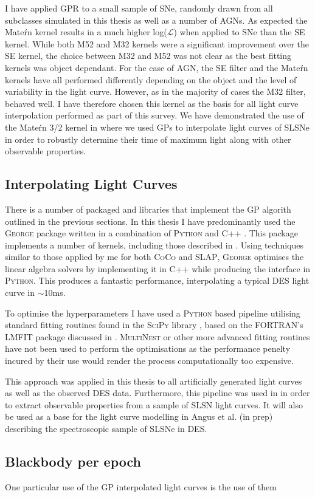 I have applied GPR to a small sample of SNe, randomly drawn from all subclasses simulated in this thesis as well as a number of AGNs. As expected the Mate\'rn kernel results in a much higher log($\mathcal{L}$) when applied to SNe than the SE kernel. While both M52 and M32 kernels were a significant improvement over the SE kernel, the choice between M32 and M52 was not clear as the best fitting kernels was object dependant. For the case of AGN, the SE filter and the Mate\'rn kernels have all performed differently depending on the object and the level of variability in the light curve. However, as in the majority of cases the M32 filter, behaved  well. I have therefore chosen this kernel as the basis for all light curve interpolation performed as part of this survey. We have demonstrated the use of the Mate\'rn 3/2 kernel in \citet{Inserra2018} where we used GPs to interpolate light curves of SLSNe in order to robustly determine their time of maximum light along with other observable properties.

\subsection{Interpolating Light Curves}
There is a number of packaged and libraries that implement the GP algorith outlined in the previous sections. In this thesis I have predominantly used the \textsc{George} package written in a combination of \textsc{Python} and \textsc{C++} \citep{Ambikasaran2014}. This package implements a number of kernels, including those described in . Using techniques similar to those applied by me for both \textsc{CoCo} and \textsc{SLAP}, \textsc{George} optimises the linear algebra solvers by implementing it in \textsc{C++} while producing the interface in \textsc{Python}. This produces a fantastic performance, interpolating a typical DES light curve in $\sim$10ms.

To optimise the hyperparameters I have used a \textsc{Python} based pipeline utilising standard fitting routines found in the \textsc{SciPy} library \citep{Oliphant2007}, based on the \textsc{FORTRAN}'s \textsc{LMFIT} package discussed in . \textsc{MultiNest} or other more advanced fitting routines have not been used to perform the optimisations as the performance penelty incured by their use would render the process computationally too expensive.

This approach was applied in this thesis to all artificially generated light curves as well as the observed DES data. Furthermore, this pipeline was used in \citet{Inserra2018} in order to extract observable properties from a sample of SLSN light curves. It will also be used as a base for the light curve modelling in Angus et al. (in prep) describing the spectroscopic sample of SLSNe in DES.

\subsection{Blackbody per epoch}
One particular use of the GP interpolated light curves is the use of them
